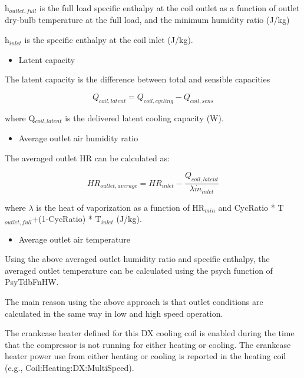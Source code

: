 h\(_{outlet,full}\) is the full load specific enthalpy at the coil outlet as a function of outlet dry-bulb temperature at the full load, and the minimum humidity ratio (J/kg)

h\(_{inlet}\) is the specific enthalpy at the coil inlet (J/kg).

\begin{itemize}
  \item Latent capacity
\end{itemize}

The latent capacity is the difference between total and sensible capacities

\begin{equation}
  Q_{coil,latent} = Q_{coil,cycling} - Q_{coil,sens}
\end{equation}

where Q\(_{coil,latent}\) is the delivered latent cooling capacity (W).

\begin{itemize}
  \item Average outlet air humidity ratio
\end{itemize}

The averaged outlet HR can be calculated as:

\begin{equation}
  HR_{outlet,average} = HR_{inlet} - \frac{Q_{coil,latent}}{{\lambda}\dot{m}_{inlet}}
\end{equation}

where \(\lambda\) is the heat of vaporization as a function of HR\(_{min}\) and CycRatio * T\(_{outlet,full}\)+(1-CycRatio) * T\(_{inlet}\) (J/kg).

\begin{itemize}
  \item Average outlet air temperature
\end{itemize}

Using the above averaged outlet humidity ratio and specific enthalpy, the averaged outlet temperature can be calculated using the psych function of PsyTdbFnHW.

The main reason using the above approach is that outlet conditions are calculated in the same way in low and high speed operation.

The crankcase heater defined for this DX cooling coil is enabled during the time that the compressor is not running for either heating or cooling. The crankcase heater power use from either heating or cooling is reported in the heating coil (e.g., Coil:Heating:DX:MultiSpeed).

